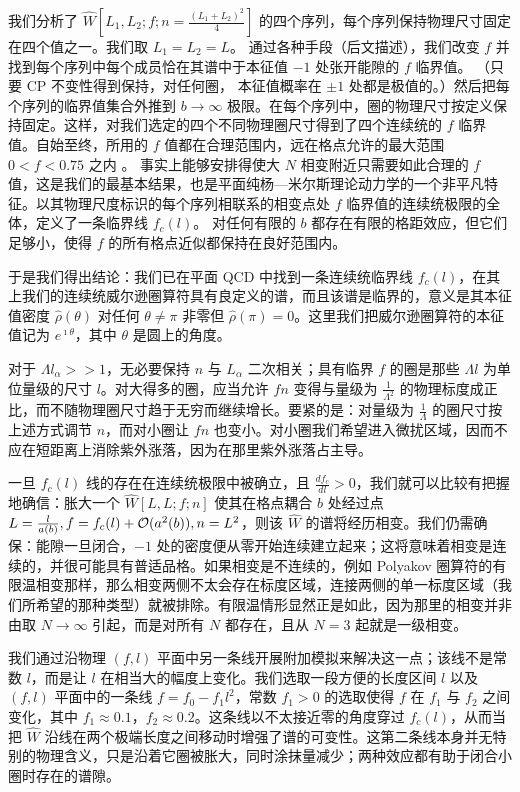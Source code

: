 我们分析了 $\hat W [L_1 , L_2; f;
n=\frac{(L_1 + L_2 )^2}{4}]$ 的四个序列，每个序列保持物理尺寸固定在四个值之一。我们取 $L_1=L_2=L$。
通过各种手段（后文描述），我们改变 $f$ 并找到每个序列中每个成员恰在其谱中于本征值 $-1$ 处张开能隙的 $f$ 临界值。
（只要 CP 不变性得到保持，对任何圈，
本征值概率在 $\pm 1$ 处都是极值的。）然后把每个序列的临界值集合外推到 $b\to\infty$ 极限。在每个序列中，圈的物理尺寸按定义保持固定。这样，对我们选定的四个不同物理圈尺寸得到了四个连续统的 $f$ 临界值。自始至终，所用的 $f$ 值都在合理范围内，远在格点允许的最大范围 $0<f<0.75$ 之内 \cite{pertsmear11}。
事实上能够安排得使大 $N$ 相变附近只需要如此合理的 $f$ 值，这是我们的最基本结果，也是平面纯杨—米尔斯理论动力学的一个非平凡特征。以其物理尺度标识的每个序列相联系的相变点处 $f$ 临界值的连续统极限的全体，定义了一条临界线 $f_c(l)$。
对任何有限的 $b$ 都存在有限的格距效应，但它们足够小，使得 $f$ 的所有格点近似都保持在良好范围内。

于是我们得出结论：我们已在平面 QCD 中找到一条连续统临界线 $f_c(l)$，在其上我们的连续统威尔逊圈算符具有良定义的谱，而且该谱是临界的，意义是其本征值密度 $\hat \rho (\theta)$ 对任何 $\theta\ne\pi$ 非零但 $\hat\rho (\pi)=0$。这里我们把威尔逊圈算符的本征值记为 $e^{\imath\theta}$，其中 $\theta$ 是圆上的角度。

对于 $\Lambda l_\alpha >>1$，无必要保持 $n$ 与 $L_\alpha$ 二次相关；具有临界 $f$ 的圈是那些 $\Lambda l $ 为单位量级的尺寸 $l$。对大得多的圈，应当允许 $f n$ 变得与量级为 $\frac{1}{\Lambda^2}$ 的物理标度成正比，而不随物理圈尺寸趋于无穷而继续增长。要紧的是：对量级为 $\frac{1}{\Lambda}$ 的圈尺寸按上述方式调节 $n$，而对小圈让 $f n$ 也变小。对小圈我们希望进入微扰区域，因而不应在短距离上消除紫外涨落，因为在那里紫外涨落占主导。

一旦 $f_c (l)$ 线的存在在连续统极限中被确立，且 $\frac{df_c}{dl} > 0$，我们就可以比较有把握地确信：胀大一个 $\hat W [L,L;f;n]$ 使其在格点耦合 $b$ 处经过点 $L=\frac{l}{a(b)},
f=f_c (l)+{\cal O}(a^2(b)), n=L^2$，则该 $\hat W$ 的谱将经历相变。我们仍需确保：能隙一旦闭合，$-1$ 处的密度便从零开始连续建立起来；这将意味着相变是连续的，并很可能具有普适品格。如果相变是不连续的，例如 Polyakov 圈算符的有限温相变那样，那么相变两侧不太会存在标度区域，连接两侧的单一标度区域（我们所希望的那种类型）就被排除。有限温情形显然正是如此，因为那里的相变并非由取 $N\to\infty$ 引起，而是对所有 $N$ 都存在，且从 $N=3$ 起就是一级相变。


我们通过沿物理 $(f,l)$ 平面中另一条线开展附加模拟来解决这一点；该线不是常数 $l$，而是让 $l$ 在相当大的幅度上变化。我们选取一段方便的长度区间 $l$ 以及 $(f,l)$ 平面中的一条线 $f=f_0-f_1 l^2$，常数 $f_1 >0$ 的选取使得 $f$ 在 $f_1$ 与 $f_2$ 之间变化，其中 $f_1\approx
0.1$，$f_2\approx 0.2$。这条线以不太接近零的角度穿过 $f_c (l)$，从而当把 $\hat W$ 沿线在两个极端长度之间移动时增强了谱的可变性。这第二条线本身并无特别的物理含义，只是沿着它圈被胀大，同时涂抹量减少；两种效应都有助于闭合小圈时存在的谱隙。

